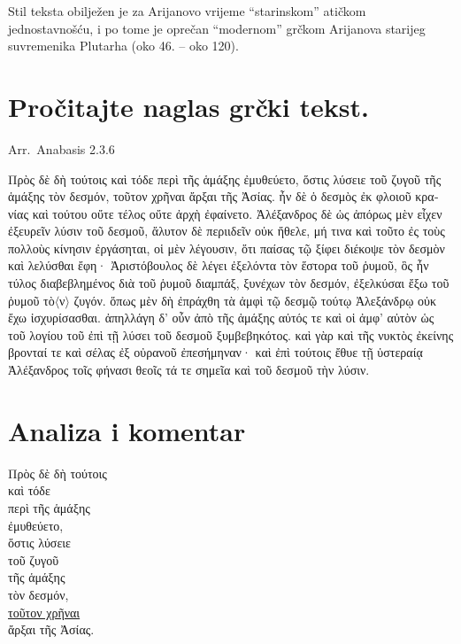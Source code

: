 Stil teksta obilježen je za Arijanovo vrijeme ``starinskom'' atičkom jednostavnošću, i po tome je oprečan ``modernom'' grčkom Arijanova starijeg suvremenika Plutarha (oko 46. – oko 120).


\section*{Pročitajte naglas grčki tekst.}


Arr.\ Anabasis 2.3.6

\medskip

{\large
\begin{greek}
\noindent Πρὸς δὲ δὴ τούτοις καὶ τόδε περὶ τῆς ἁμάξης ἐμυθεύετο, ὅστις λύσειε τοῦ ζυγοῦ τῆς ἁμάξης τὸν δεσμόν, τοῦτον χρῆναι ἄρξαι τῆς Ἀσίας. ἦν δὲ ὁ δεσμὸς ἐκ φλοιοῦ κρανίας καὶ τούτου οὔτε τέλος οὔτε ἀρχὴ ἐφαίνετο. Ἀλέξανδρος δὲ ὡς ἀπόρως μὲν εἶχεν ἐξευρεῖν λύσιν τοῦ δεσμοῦ, ἄλυτον δὲ περιιδεῖν οὐκ ἤθελε, μή τινα καὶ τοῦτο ἐς τοὺς πολλοὺς κίνησιν ἐργάσηται, οἱ μὲν λέγουσιν, ὅτι παίσας τῷ ξίφει διέκοψε τὸν δεσμὸν καὶ λελύσθαι ἔφη· Ἀριστόβουλος δὲ λέγει ἐξελόντα τὸν ἕστορα τοῦ ῥυμοῦ, ὃς ἦν τύλος διαβεβλημένος διὰ τοῦ ῥυμοῦ διαμπάξ, ξυνέχων τὸν δεσμόν, ἐξελκύσαι ἔξω τοῦ ῥυμοῦ τὸ$\langle$ν$\rangle$ ζυγόν. ὅπως μὲν δὴ ἐπράχθη τὰ ἀμφὶ τῷ δεσμῷ τούτῳ Ἀλεξάνδρῳ οὐκ ἔχω ἰσχυρίσασθαι. ἀπηλλάγη  δ' οὖν ἀπὸ τῆς ἁμάξης αὐτός τε καὶ οἱ ἀμφ' αὐτὸν ὡς τοῦ λογίου τοῦ ἐπὶ τῇ λύσει τοῦ δεσμοῦ ξυμβεβηκότος. καὶ γὰρ καὶ τῆς νυκτὸς ἐκείνης βρονταί τε καὶ σέλας ἐξ οὐρανοῦ ἐπεσήμηναν· καὶ ἐπὶ τούτοις ἔθυε τῇ ὑστεραίᾳ Ἀλέξανδρος τοῖς φήνασι θεοῖς τά τε σημεῖα καὶ τοῦ δεσμοῦ τὴν λύσιν.
\end{greek}

}



\section*{Analiza i komentar}



{\large
\noindent Πρὸς δὲ δὴ τούτοις \\
καὶ τόδε \\
\tabto{2em} περὶ τῆς ἁμάξης \\
ἐμυθεύετο, \\
\tabto{2em} ὅστις λύσειε \\
\tabto{4em} τοῦ ζυγοῦ\\
\tabto{6em} τῆς ἁμάξης \\
\tabto{2em} τὸν δεσμόν, \\
\underline{τοῦτον χρῆναι} \\
\tabto{2em} ἄρξαι τῆς Ἀσίας.\\

}

